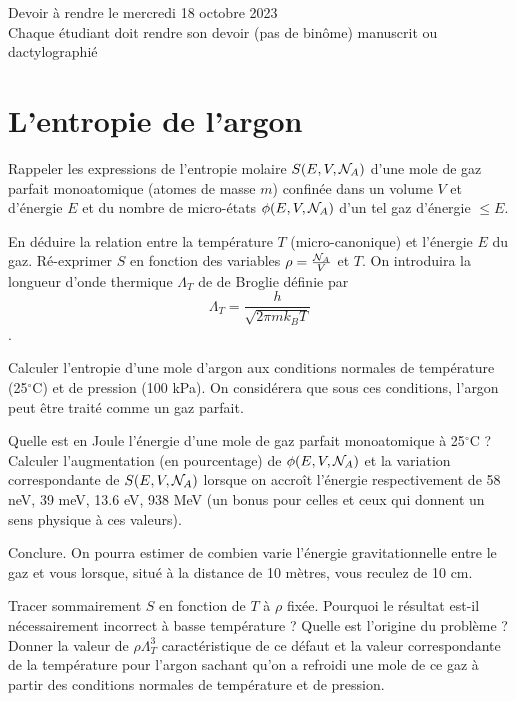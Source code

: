 \documentclass[utf8, 11pt]{feuille}
\begin{document}
\begin{center}
Devoir à rendre le mercredi 18 octobre 2023 \\
Chaque étudiant doit rendre son devoir (pas de binôme) manuscrit ou dactylographié
\end{center}

\section{L'entropie de l'argon}


\question
Rappeler les expressions de l'entropie molaire $S(E,V,{\cal N}_A)$ d'une mole de gaz parfait monoatomique (atomes de masse $m$) confinée dans un volume $V$ et d'énergie $E$ et du nombre de micro-états $\phi(E,V,{\cal N}_A)$ d'un tel gaz d'énergie $\leq E$. 

\question En déduire la relation entre la température $T$ (micro-canonique) et l'énergie $E$ du gaz. Ré-exprimer $S$ en fonction des variables $\rho=\frac{{\cal N}_A}{V}$ et $T$. On introduira la longueur d'onde thermique $\Lambda_T$ de de Broglie définie par
$$\Lambda_T=\frac{h}{\sqrt{2 \pi m k_B T}}$$.

\question Calculer l'entropie d'une mole d'argon aux conditions normales de température (25$^\circ$C) et de pression (100 kPa).
On considérera que sous ces conditions, l'argon peut être traité comme un gaz parfait.

\question Quelle est en Joule l'énergie d'une mole de gaz parfait monoatomique à  25$^\circ$C ? Calculer l'augmentation (en pourcentage) de $\phi(E,V,{\cal N}_A)$ et la variation correspondante de $S(E,V,{\cal N}_A)$  lorsque on accroît l'énergie respectivement de 58 neV, 39 meV, 13.6 eV, 938 MeV (un bonus pour celles et ceux qui donnent un sens physique à ces valeurs). 

\question Conclure. On pourra estimer de combien varie l'énergie gravitationnelle entre le gaz et vous lorsque, situé à la distance de 10 mètres, vous reculez de 10 cm.

\question Tracer sommairement $S$ en fonction de $T$ à $\rho$ fixée. Pourquoi le résultat est-il nécessairement incorrect à basse température ? Quelle est l'origine du problème ? Donner la valeur de $\rho \Lambda_T^3 $ caractéristique de ce défaut et la valeur correspondante de la température pour l'argon sachant qu'on a refroidi une mole de ce gaz à partir des conditions normales de température et de pression.
\end{document}

